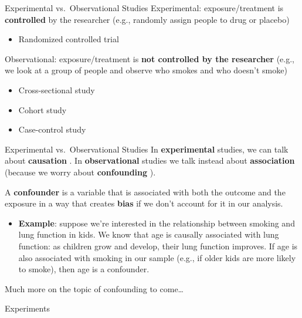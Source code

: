 \documentclass[
  ignorenonframetext,
]{beamer}
\providecommand{\tightlist}{%
  \setlength{\itemsep}{0pt}\setlength{\parskip}{0pt}}
\begin{document}
\begin{frame}{Experimental vs.~Observational Studies}
\protect\hypertarget{experimental-vs.-observational-studies}{}
{Experimental}: exposure/treatment is \textbf{controlled} by the
researcher (e.g., randomly assign people to drug or placebo)

\begin{itemize}
\tightlist
\item
  Randomized controlled trial
\end{itemize}

{Observational}: exposure/treatment is \textbf{not controlled by the
researcher} (e.g., we look at a group of people and observe who smokes
and who doesn't smoke)

\begin{itemize}
\tightlist
\item
  Cross-sectional study
\item
  Cohort study
\item
  Case-control study
\end{itemize}
\end{frame}

\begin{frame}{Experimental vs.~Observational Studies}
\protect\hypertarget{experimental-vs.-observational-studies-1}{}
In {\textbf{experimental}} studies, we can talk about {
\textbf{causation}} . In {\textbf{observational}} studies we talk
instead about { \textbf{association}} (because we worry about
\textbf{confounding} ).

A {\textbf{confounder}} is a variable that is associated with both the
outcome and the exposure in a way that creates \textbf{bias} if we don't
account for it in our analysis.

\begin{itemize}
\tightlist
\item
  \textbf{Example}: suppose we're interested in the relationship between
  smoking and lung function in kids. We know that age is causally
  associated with lung function: as children grow and develop, their
  lung function improves. If age is also associated with smoking in our
  sample (e.g., if older kids are more likely to smoke), then age is a
  confounder.
\end{itemize}

Much more on the topic of confounding to come\ldots{}
\end{frame}

\begin{frame}{}
\protect\hypertarget{section}{}
Experiments
\end{frame}
\end{document}
